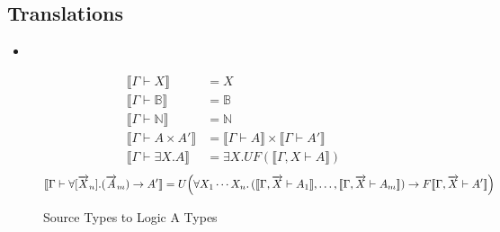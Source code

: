 \documentclass[acmsmall]{acmart}
\newcommand{\den}[1]{\llbracket #1\rrbracket}
\begin{document}
\subsection{Translations}
\begin{itemize}
  \item 
\end{itemize}




\begin{figure}[h]
\centering
\footnotesize
\begin{align*}
\den{\Gamma \vdash X} &= X \\
\den{\Gamma \vdash \mathbb{B}} &= \mathbb{B} \\
\den{\Gamma \vdash \mathbb{N}} &= \mathbb{N} \\
\den{\Gamma \vdash A\times A'} &= \den{\Gamma \vdash A}\times \den{\Gamma \vdash A'} \\
\den{\Gamma \vdash \exists X.A} &= \exists X.UF(\den{\Gamma ,X\vdash A})
\end{align*}
\[
\den{\Gamma \vdash \forall[\overrightarrow{X}_n].(\overrightarrow{A}_m)\to A'} 
= U\Bigl(\forall X_1\cdots X_n.\,(\den{\Gamma,\overrightarrow{X}\vdash A_1}, \ldots, \den{\Gamma,\overrightarrow{X}\vdash A_m}) \to F\den{\Gamma,\overrightarrow{X}\vdash A'}\Bigr)
\]
\caption{Source Types to Logic A Types}
\end{figure}

  
\end{document}
